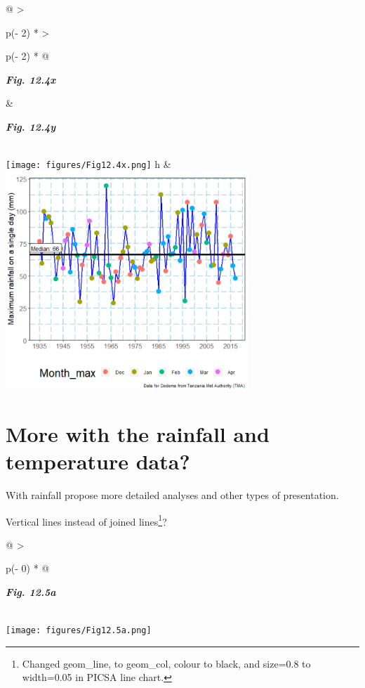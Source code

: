 \documentclass[
  letterpaper,
  DIV=11,
  numbers=noendperiod]{scrreprt}
\begin{document}
\begin{longtable}[]{@{}
  >{\raggedright\arraybackslash}p{(\columnwidth - 2\tabcolsep) * }
  >{\raggedright\arraybackslash}p{(\columnwidth - 2\tabcolsep) * }@{}}
\toprule\noalign{}
\begin{minipage}[b]{\linewidth}\raggedright
\textbf{\emph{Fig. 12.4x}}
\end{minipage} & \begin{minipage}[b]{\linewidth}\raggedright
\textbf{\emph{Fig. 12.4y}}
\end{minipage} \\
\midrule\noalign{}
\endhead
\bottomrule\noalign{}
\endlastfoot
\texttt{[image: figures/Fig12.4x.png]}
h &
\includegraphics[width=3.59625in,height=\textheight]{figures/Fig12.4y.png} \\
\end{longtable}

\section{More with the rainfall and temperature
data?}\label{more-with-the-rainfall-and-temperature-data}

With rainfall propose more detailed analyses and other types of
presentation.

Vertical lines instead of joined lines\footnote{Changed geom\_line, to
  geom\_col, colour to black, and size=0.8 to width=0.05 in PICSA line
  chart.}?

\begin{longtable}[]{@{}
  >{\raggedright\arraybackslash}p{(\columnwidth - 0\tabcolsep) * }@{}}
\toprule\noalign{}
\begin{minipage}[b]{\linewidth}\raggedright
\textbf{\emph{Fig. 12.5a}}
\end{minipage} \\
\midrule\noalign{}
\endhead
\bottomrule\noalign{}
\endlastfoot
\texttt{[image: figures/Fig12.5a.png]} \\
\end{longtable}
\end{document}
